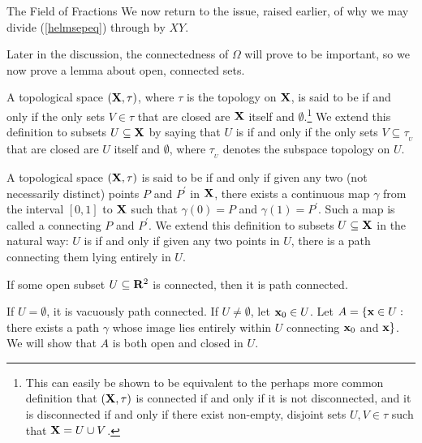 \begin{section}{The Field of Fractions}
We now return to the issue, raised earlier, of why we may divide (\ref{helmsepeq}) through by $XY$.

Later in the discussion, the connectedness of $\Omega$ will prove to be important, so we now prove a lemma about open, connected sets.

\begin{definition}
\label{con}
A topological space $(\mathbf{X}, \tau)$, where $\tau$ is the topology on $\mathbf{X}$, is said to be  if and only if the only sets $V \in \tau$ that are closed are $\mathbf{X}$ itself and $\emptyset$.\footnote{This can easily be shown to be equivalent to the perhaps more common definition that $(\mathbf{X}, \tau)$ is connected if and only if it is not disconnected, and it is disconnected if and only if there exist non-empty, disjoint sets $U, V \in \tau$ such that $\mathbf{X} = U \cup V$.}  We extend this definition to subsets $U \subseteq \mathbf{X}$ by saying that $U$ is  if and only if the only sets $V \subseteq \tau_{_U}$ that are closed are $U$ itself and $\emptyset$, where $\tau_{_U}$ denotes the subspace topology on $U$.
\end{definition}

\begin{definition}
\label{pathcon}
A topological space $(\mathbf{X}, \tau)$ is said to be  if and only if given any two (not necessarily distinct) points $P$ and $P^\prime$ in $\mathbf{X}$, there exists a continuous map $\gamma$ from the interval $[0,1]$ to $\mathbf{X}$ such that $\gamma(0) = P$ and $\gamma(1) = P^\prime$.  Such a map is called a  connecting $P$ and $P^\prime$.  We extend this definition to subsets $U \subseteq \mathbf{X}$ in the natural way: $U$ is  if and only if given any two points in $U$, there is a path connecting them lying entirely in $U$.
\end{definition}

\begin{lemma}
\label{conimpliespath}
If some open subset $U \subseteq \mathbf{R}^2$ is connected, then it is path connected.
\end{lemma}

\proof
If $U = \emptyset$, it is vacuously path connected.  If $U \not= \emptyset$, let $\mathbf{x}_0 \in U$.  Let $A = \{\mathbf{x} \in U :$ there exists a path $\gamma$ whose image lies entirely within $U$ connecting $\mathbf{x}_0$ and $\mathbf{x} \}$.  We will show that $A$ is both open and closed in $U$.


\end{section}
